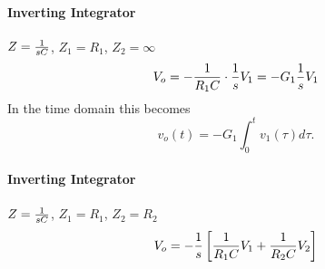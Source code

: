 \paragraph{Inverting Integrator} $Z = {1 \over sC}$, $Z_1 = R_1$, $Z_2 = \infty$
\begin{equation}\label{eqn:integrator}
V_o = - {1 \over R_1 C} \cdot {1 \over s} V_1 = -G_1 {1 \over s} V_1
\end{equation}
In the time domain this becomes
\begin{equation*}
	v_o(t) = -G_1 \int_{0}^{t} v_1(\tau) d\tau.
\end{equation*}

\paragraph{Inverting Integrator} $Z = {1 \over sC}$, $Z_1 = R_1$, $Z_2 = R_2$
\begin{equation}\label{eqn:first-order}
V_o = - {1 \over s} \left[ {1 \over R_1 C} V_1 + {1 \over R_2 C} V_2 \right]
\end{equation}
